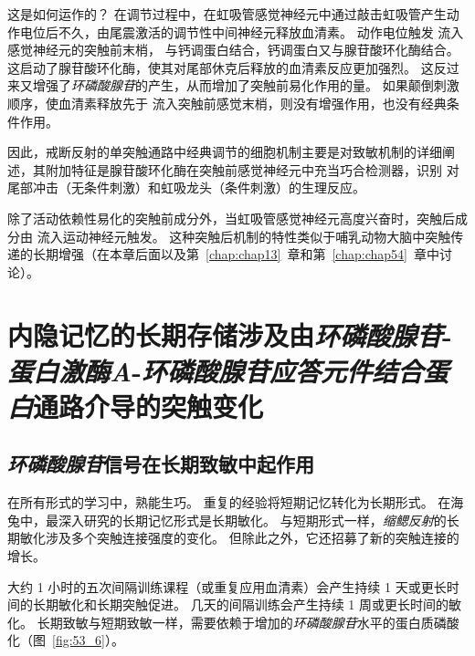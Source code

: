 这是如何运作的？
在调节过程中，在虹吸管感觉神经元中通过敲击虹吸管产生动作电位后不久，由尾震激活的调节性中间神经元释放血清素。
动作电位触发  流入感觉神经元的突触前末梢， 与钙调蛋白结合，钙调蛋白又与腺苷酸环化酶结合。
这启动了腺苷酸环化酶，使其对尾部休克后释放的血清素反应更加强烈。
这反过来又增强了\textit{环磷酸腺苷}的产生，从而增加了突触前易化作用的量。
如果颠倒刺激顺序，使血清素释放先于  流入突触前感觉末梢，则没有增强作用，也没有经典条件作用。


因此，戒断反射的单突触通路中经典调节的细胞机制主要是对致敏机制的详细阐述，其附加特征是腺苷酸环化酶在突触前感觉神经元中充当巧合检测器，识别 对尾部冲击（无条件刺激）和虹吸龙头（条件刺激）的生理反应。


除了活动依赖性易化的突触前成分外，当虹吸管感觉神经元高度兴奋时，突触后成分由  流入运动神经元触发。
这种突触后机制的特性类似于哺乳动物大脑中突触传递的长期增强（在本章后面以及第~\ref{chap:chap13}~章和第~\ref{chap:chap54}~章中讨论）。



\section{内隐记忆的长期存储涉及由\textit{环磷酸腺苷}-\textit{蛋白激酶A}-\textit{环磷酸腺苷应答元件结合蛋白}通路介导的突触变化}

\subsection{\textit{环磷酸腺苷}信号在长期致敏中起作用}

在所有形式的学习中，熟能生巧。
重复的经验将短期记忆转化为长期形式。
在海兔中，最深入研究的长期记忆形式是长期敏化。
与短期形式一样，\textit{缩鳃反射}的长期敏化涉及多个突触连接强度的变化。
但除此之外，它还招募了新的突触连接的增长。


大约 1 小时的五次间隔训练课程（或重复应用血清素）会产生持续 1 天或更长时间的长期敏化和长期突触促进。
几天的间隔训练会产生持续 1 周或更长时间的敏化。
长期致敏与短期致敏一样，需要依赖于增加的\textit{环磷酸腺苷}水平的蛋白质磷酸化（图~\ref{fig:53_6}）。


